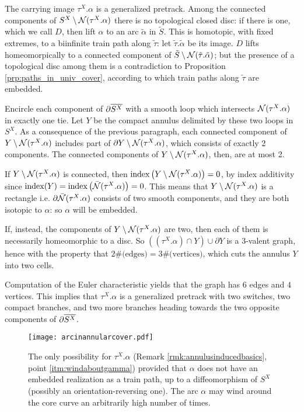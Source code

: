 \begin{rmk}
\begin{enumerate}
The carrying image $\tau^X.\alpha$ is a generalized pretrack. Among the connected components of $S^X\setminus{\mathcal N}(\tau^X.\alpha)$ there is no topological closed disc: if there is one, which we call $D$, then lift $\alpha$ to an arc $\tilde\alpha$ in $\tilde S$. This is homotopic, with fixed extremes, to a biinfinite train path along $\tilde\tau$: let $\tilde\tau.\tilde\alpha$ be its image. $D$ lifts homeomorpically to a connected component of $\tilde S\setminus{\mathcal N}(\tilde\tau.\tilde\alpha)$; but the presence of a topological disc among them is a contradiction to Proposition \ref{prp:paths_in_univ_cover}, according to which train paths along $\tilde\tau$ are embedded.

Encircle each component of $\partial\overline{S^X}$ with a smooth loop which intersects ${\mathcal N}(\tau^X.\alpha)$ in exactly one tie. Let $Y$ be the compact annulus delimited by these two loops in $S^X$. As a consequence of the previous paragraph, each connected component of $Y\setminus {\mathcal N}(\tau^X.\alpha)$ includes part of $\partial Y\setminus{\mathcal N}(\tau^X.\alpha)$, which consists of exactly 2 components. The connected components of $Y\setminus {\mathcal N}(\tau^X.\alpha)$, then, are at most 2.

If $Y\setminus {\mathcal N}(\tau^X.\alpha)$ is connected, then $\mathrm{index}\left(Y\setminus {\mathcal N}(\tau^X.\alpha)\right)=0$, by index additivity since $\mathrm{index}(Y)=\mathrm{index}\left(\bar{{\mathcal N}}(\tau^X.\alpha)\right)=0$. This means that $Y\setminus {\mathcal N}(\tau^X.\alpha)$ is a rectangle i.e. $\partial\bar{{\mathcal N}}(\tau^X.\alpha)$ consists of two smooth components, and they are both isotopic to $\alpha$: so $\alpha$ will be embedded.

If, instead, the components of $Y\setminus {\mathcal N}(\tau^X.\alpha)$ are two, then each of them is necessarily homeomorphic to a disc. So $\left((\tau^X.\alpha)\cap Y\right)\cup\partial Y$ is a 3-valent graph, hence with the property that $2\#\text{(edges)}=3\#\text{(vertices)}$, which cuts the annulus $Y$ into two cells. 

Computation of the Euler characteristic yields that the graph has $6$ edges and $4$ vertices. This implies that $\tau^X.\alpha$ is a generalized pretrack with two switches, two compact branches, and two more branches heading towards the two opposite components of $\partial\overline{S^X}$.

\begin{figure}[h]
\centering
\texttt{[image: arcinannularcover.pdf]}
\caption{\label{fig:arcinannularcover}The only possibility for $\tau^X.\alpha$ (Remark \ref{rmk:annulusinducedbasics}, point \ref{itm:windaboutgamma}) provided that $\alpha$ does not have an embedded realization as a train path, up to a diffeomorphism of $S^X$ (possibly an orientation-reversing one). The arc $\alpha$ may wind around the core curve an arbitrarily high number of times.}
\end{figure}


\end{enumerate}
\end{rmk}
